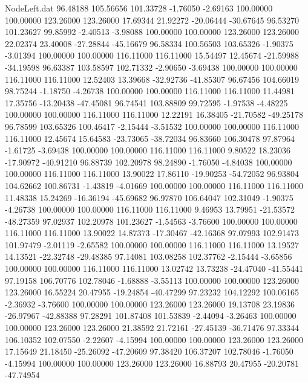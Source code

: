 \begin{filecontents}{NodeLeft.dat}
  96.48188  105.56656  101.33728    -1.76050   -2.69163  100.00000  100.00000  123.26000  123.26000   17.69344   21.92272  -20.06444  -30.67645
  96.53270  101.23627   99.85992    -2.40513   -3.98088  100.00000  100.00000  123.26000  123.26000   22.02374   23.40008  -27.28844  -45.16679
  96.58334  100.56503  103.65326    -1.90375   -3.01394  100.00000  100.00000  116.11000  116.11000   15.54497   12.45674  -21.59988  -34.19598
  96.63387  103.58597  102.71332    -2.90650   -3.69438  100.00000  100.00000  116.11000  116.11000   12.52403   13.39668  -32.92736  -41.85307
  96.67456  104.66019   98.75244    -1.18750   -4.26738  100.00000  100.00000  116.11000  116.11000   11.44981   17.35756  -13.20438  -47.45081
  96.74541  103.88809   99.72595    -1.97538   -4.48225  100.00000  100.00000  116.11000  116.11000   12.22191   16.38405  -21.70582  -49.25178
  96.78599  103.65326  100.46417    -2.15444   -3.51532  100.00000  100.00000  116.11000  116.11000   12.45674   15.64583  -23.73065  -38.72034
  96.83660  106.30478   97.87964    -1.61725   -3.69438  100.00000  100.00000  116.11000  116.11000    9.80522   18.23036  -17.90972  -40.91210
  96.88739  102.20978   98.24890    -1.76050   -4.84038  100.00000  100.00000  116.11000  116.11000   13.90022   17.86110  -19.90253  -54.72052
  96.93804  104.62662  100.86731    -1.43819   -4.01669  100.00000  100.00000  116.11000  116.11000   11.48338   15.24269  -16.36194  -45.69682
  96.97870  106.64047  102.31049    -1.90375   -4.26738  100.00000  100.00000  116.11000  116.11000    9.46953   13.79951  -21.53572  -48.27359
  97.02937  102.20978  101.23627    -1.54563   -3.76600  100.00000  100.00000  116.11000  116.11000   13.90022   14.87373  -17.30467  -42.16368
  97.07993  102.91473  101.97479    -2.01119   -2.65582  100.00000  100.00000  116.11000  116.11000   13.19527   14.13521  -22.32748  -29.48385
  97.14081  103.08258  102.37762    -2.15444   -3.65856  100.00000  100.00000  116.11000  116.11000   13.02742   13.73238  -24.47040  -41.55441
  97.19158  106.70776  102.78046    -1.68888   -3.55113  100.00000  100.00000  123.26000  123.26000   16.55224   20.47955  -19.24854  -40.47299
  97.23232  104.12292  100.06165    -2.36932   -3.76600  100.00000  100.00000  123.26000  123.26000   19.13708   23.19836  -26.97967  -42.88388
  97.28291  101.87408  101.53839    -2.44094   -3.26463  100.00000  100.00000  123.26000  123.26000   21.38592   21.72161  -27.45139  -36.71476
  97.33344  106.10352  102.07550    -2.22607   -4.15994  100.00000  100.00000  123.26000  123.26000   17.15649   21.18450  -25.26092  -47.20609
  97.38420  106.37207  102.78046    -1.76050   -4.15994  100.00000  100.00000  123.26000  123.26000   16.88793   20.47955  -20.20781  -47.74954

\end{filecontents}
